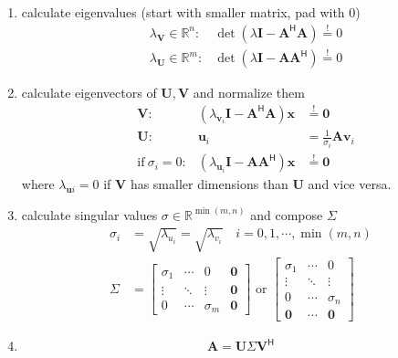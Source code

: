 \begin{enumerate}
    \item calculate eigenvalues (start with smaller matrix, pad with 0)
          \noindent\begin{align*}
               & \lambda_{\mathbf{V}}\in \mathbb{R}^n: & \det\left(\lambda \mathbf{I}-\mathbf{A}^{\mathsf{H}}\mathbf{A}\right)\overset{!}{=}0 \\
               & \lambda_{\mathbf{U}}\in \mathbb{R}^m: & \det\left(\lambda \mathbf{I}-\mathbf{AA}^{\mathsf{H}}\right)\overset{!}{=}0
          \end{align*}
    \item calculate eigenvectors of $\mathbf{U},\mathbf{V}$ and normalize them
          \noindent\begin{align*}
               & \mathbf{V}:                & \left(\lambda_{\mathbf{v}_i} \mathbf{I} -\mathbf{A}^{\mathsf{H}} \mathbf{A}\right)\mathbf{x} & \overset{!}{=}\mathbf{0}          \\
               & \mathbf{U}:                & \mathbf{u}_i                                                                                 & = \frac{1}{\sigma_i}\mathbf{Av}_i \\
               & \mathrm{if}~\sigma_i = 0 : & \left(\lambda_{\mathbf{u}_i} \mathbf{I} -\mathbf{AA}^{\mathsf{H}}\right)\mathbf{x}           & \overset{!}{=}\mathbf{0}
          \end{align*}
          where $\lambda_{\mathbf{u}i}=0$ if $\mathbf{V}$ has smaller dimensions than $\mathbf{U}$ and vice versa.
    \item calculate singular values $\sigma\in \mathbb{R}^{\min(m,n)}$ and compose $\Sigma$
          \noindent\begin{align*}
              \sigma_i & = \sqrt{\lambda_{u_i}} = \sqrt{\lambda_{v_i}}\quad i=0,1,\cdots, \min(m,n) \\
              \Sigma   & = \begin{bmatrix}
                               \sigma_1 & \cdots & 0          & \mathbf{0} \\
                               \vdots   & \ddots & \vdots     & \mathbf{0} \\
                               0        & \cdots & \sigma_{m} & \mathbf{0}
                           \end{bmatrix}\text{ or }
              \begin{bmatrix}
                  \sigma_1   & \cdots & 0          \\
                  \vdots     & \ddots & \vdots     \\
                  0          & \cdots & \sigma_{n} \\
                  \mathbf{0} & \cdots & \mathbf{0}
              \end{bmatrix}
          \end{align*}
    \item \noindent\begin{equation*}
              \mathbf{A}=\mathbf{U}\Sigma \mathbf{V}^{\mathsf{H}}
          \end{equation*}
\end{enumerate}

